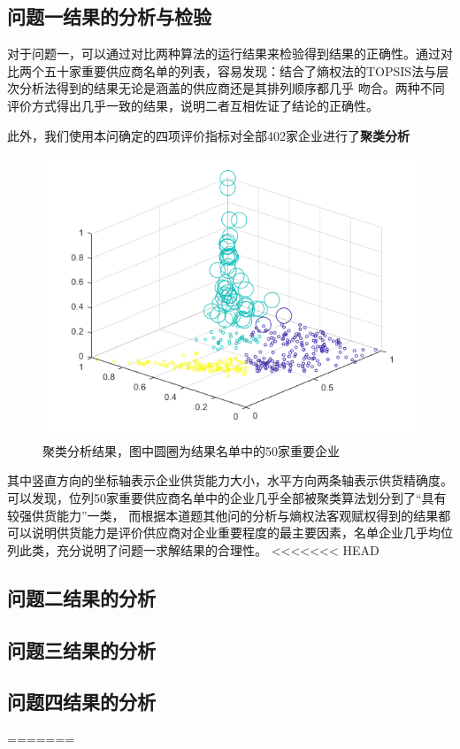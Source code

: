 \documentclass{cumcmthesis}
\begin{document}
\subsection{问题一结果的分析与检验}
对于问题一，可以通过对比两种算法的运行结果来检验得到结果的正确性。通过对比两个五十家重要供应商名单的列表，容易发现：结合了熵权法的TOPSIS法与层次分析法得到的结果无论是涵盖的供应商还是其排列顺序都几乎
吻合。两种不同评价方式得出几乎一致的结果，说明二者互相佐证了结论的正确性。\par
此外，我们使用本问确定的四项评价指标对全部402家企业进行了\textbf{聚类分析}
\begin{figure}[H]
    \centering
    \includegraphics[scale = 0.7]{julei.png}
    \centering
    \caption{聚类分析结果，图中圆圈为结果名单中的50家重要企业} \label{fig:5}
\end{figure}
其中竖直方向的坐标轴表示企业供货能力大小，水平方向两条轴表示供货精确度。可以发现，位列50家重要供应商名单中的企业几乎全部被聚类算法划分到了“具有较强供货能力”一类，
而根据本道题其他问的分析与熵权法客观赋权得到的结果都可以说明供货能力是评价供应商对企业重要程度的最主要因素，名单企业几乎均位列此类，充分说明了问题一求解结果的合理性。
<<<<<<< HEAD
\subsection{问题二结果的分析}
\subsection{问题三结果的分析}
\subsection{问题四结果的分析}
=======
\end{document}
